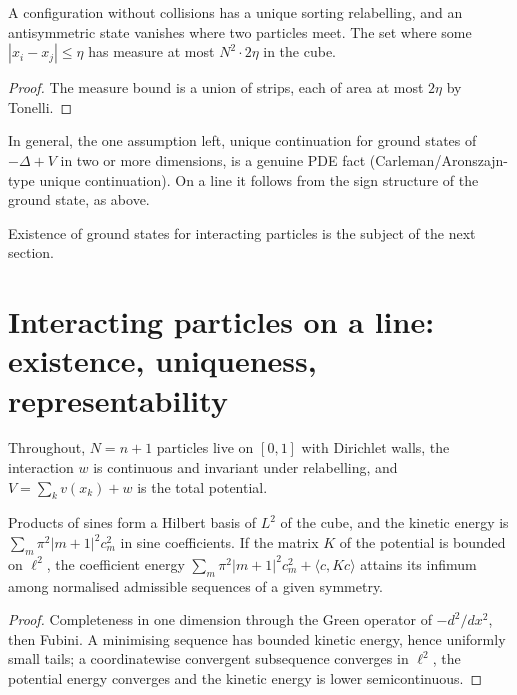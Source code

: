 \begin{lemma}
  \label{lem:line_chamber}
  \leanok
  A configuration without collisions has a unique sorting relabelling, and an antisymmetric state vanishes where
  two particles meet. The set where some $|x_i-x_j|\le\eta$ has measure at most $N^2\cdot2\eta$ in the cube.
\end{lemma}
\begin{proof}
  \leanok
  The measure bound is a union of strips, each of area at most $2\eta$ by Tonelli.
\end{proof}

In general, the one assumption left, unique continuation for ground states of $-\Delta+V$ in two or more
dimensions, is a genuine PDE fact (Carleman/Aronszajn-type unique continuation). On a line it follows from the sign
structure of the ground state, as above.

Existence of ground states for interacting particles is the subject of the next section.

\section{Interacting particles on a line: existence, uniqueness, representability}

Throughout, $N=n+1$ particles live on $[0,1]$ with Dirichlet walls, the interaction $w$ is continuous and
invariant under relabelling, and $V=\sum_k v(x_k)+w$ is the total potential.

\begin{theorem}
  \label{thm:line_sine_exists}
  \leanok
  Products of sines form a Hilbert basis of $L^2$ of the cube, and the kinetic energy is $\sum_m\pi^2|m+1|^2c_m^2$ in
  sine coefficients. If the matrix $K$ of the potential is bounded on $\ell^2$, the coefficient energy
  $\sum_m\pi^2|m+1|^2c_m^2+\langle c,Kc\rangle$ attains its infimum among normalised admissible sequences of a given
  symmetry.
\end{theorem}
\begin{proof}
  \leanok
  Completeness in one dimension through the Green operator of $-d^2/dx^2$, then Fubini. A minimising sequence has
  bounded kinetic energy, hence uniformly small tails; a coordinatewise convergent subsequence converges in
  $\ell^2$, the potential energy converges and the kinetic energy is lower semicontinuous.
\end{proof}

